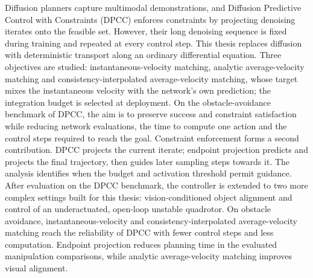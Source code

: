 \ifstandalone
Diffusion planners capture multimodal demonstrations, and Diffusion Predictive Control with
Constraints (DPCC) enforces constraints by projecting denoising iterates onto the feasible set.
However, their long denoising sequence is fixed during training and repeated at every control step.
This thesis replaces diffusion with deterministic transport along an ordinary differential equation.
Three objectives are studied: instantaneous-velocity matching, analytic average-velocity matching and
consistency-interpolated average-velocity matching, whose target mixes the instantaneous velocity with
the network's own prediction; the integration budget is selected at deployment. On the
obstacle-avoidance benchmark of DPCC, the aim is to preserve success and
constraint satisfaction while reducing network evaluations, the time to compute one action and the
control steps required to reach the goal. Constraint enforcement forms a second contribution. DPCC projects the
current iterate; endpoint projection predicts and projects the final trajectory,
then guides later sampling steps towards it. The analysis identifies when the budget and activation threshold permit guidance. After evaluation on the DPCC benchmark, the controller is extended to two
more complex settings built for this thesis: vision-conditioned object alignment and control of an
underactuated, open-loop unstable quadrotor. On obstacle avoidance, instantaneous-velocity and
consistency-interpolated average-velocity matching reach the reliability of DPCC with fewer control
steps and less computation. Endpoint projection reduces planning time in the evaluated manipulation
comparisons, while analytic average-velocity matching improves visual alignment.
\fi
{}

\tableofcontents{}

\mainmatter{}

